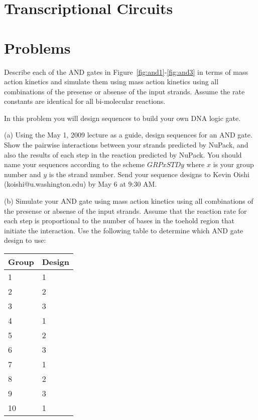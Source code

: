\section{Transcriptional Circuits}

\section{Problems}

\setcounter{exercount}{0}

\begin{exercise}
  Describe each of the AND gates in
  Figure~\ref{fig:and1}-\ref{fig:and3} in terms of mass action
  kinetics and simulate them using mass action kinetics using all
  combinations of the presense or absense of the input strands. Assume the rate constants are identical
  for all bi-molecular reactions. 
\end{exercise}

\begin{exercise}
  In this problem you will design sequences to build your own DNA
  logic gate.  

  (a) Using the May 1, 2009 lecture as a guide, design sequences for
  an AND gate. Show the pairwise interactions between your strands
  predicted by NuPack, and also the results of each step in the
  reaction predicted by NuPack. You should name your sequences
  according to the scheme $GRPxSTDy$ where $x$ is your group number
  and $y$ is the strand number. Send your sequence designs to Kevin
  Oishi (koishi@u.washington.edu) by May 6 at 9:30 AM.

  (b) Simulate your AND gate using mass action kinetics using all
  combinations of the presense or absense of the input strands. Assume
  that the reaction rate for each step is proportional to the number
  of bases in the toehold region that initiate the interaction. Use
  the following table to determine which AND gate design to use:
\begin{center}
\begin{tabular}{l|l}
Group & Design \\
\hline
1 & 1 \\
2 & 2 \\
3 & 3 \\
4 & 1 \\
5 & 2 \\
6 & 3 \\
7 & 1 \\
8 & 2 \\
9 & 3 \\
10 & 1
\end{tabular}
\end{center}
\end{exercise}

